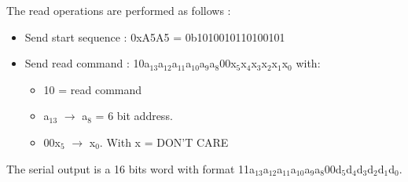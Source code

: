 \noindent The read operations are performed as follows :
\begin{itemize}
	\item Send start sequence : 0xA5A5 = 0b1010010110100101
	\item Send read command : 10a$_{13}$a$_{12}$a$_{11}$a$_{10}$a$_{9}$a$_{8}$00x$_{5}$x$_{4}$x$_{3}$x$_{2}$x$_{1}$x$_{0}$ with:
	\begin{itemize}
		\item 10 = read command
		\item a$_{13}$ $\rightarrow$ a$_{8}$ = 6 bit address.
		\item 00x$_{5}$ $\rightarrow$ x$_{0}$. With x = DON'T CARE 
	\end{itemize}
\end{itemize}
\noindent The serial output is a 16 bits word with format 11a$_{13}$a$_{12}$a$_{11}$a$_{10}$a$_{9}$a$_{8}$00d$_{5}$d$_{4}$d$_{3}$d$_{2}$d$_{1}$d$_{0}$.
